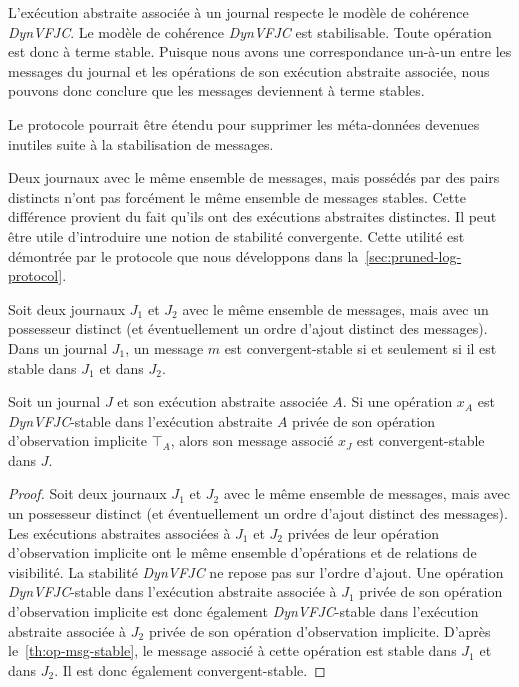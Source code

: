 L'exécution abstraite associée à un journal respecte le modèle de cohérence \emph{DynVFJC}.
Le modèle de cohérence \emph{DynVFJC} est stabilisable.
Toute opération est donc à terme stable.
Puisque nous avons une correspondance un-à-un entre les messages du journal et les opérations de son exécution abstraite associée, nous pouvons donc conclure que les messages deviennent à terme stables.

Le protocole pourrait être étendu pour supprimer les méta-données devenues inutiles suite à la stabilisation de messages.

Deux journaux avec le même ensemble de messages, mais possédés par des pairs distincts n'ont pas forcément le même ensemble de messages stables.
Cette différence provient du fait qu'ils ont des exécutions abstraites distinctes.
Il peut être utile d'introduire une notion de stabilité convergente.
Cette utilité est démontrée par le protocole que nous développons dans la~\autoref{sec:pruned-log-protocol}.

\begin{definition}\label{def:msg-conv-stable}
Soit deux journaux $J_1$ et $J_2$ avec le même ensemble de messages, mais avec un possesseur distinct (et éventuellement un ordre d'ajout distinct des messages).
Dans un journal $J_1$, un message $m$ est convergent-stable si et seulement si il est stable dans $J_1$ et dans $J_2$.
\end{definition}

\begin{theorem}
Soit un journal $J$ et son exécution abstraite associée $A$.
Si une opération $x_A$ est \emph{DynVFJC}-stable dans l'exécution abstraite $A$ privée de son opération d'observation implicite $\top_A$, alors son message associé $x_J$ est convergent-stable dans $J$.
\end{theorem}

\begin{proof}
Soit deux journaux $J_1$ et $J_2$ avec le même ensemble de messages, mais avec un possesseur distinct (et éventuellement un ordre d'ajout distinct des messages).
Les exécutions abstraites associées à $J_1$ et $J_2$ privées de leur opération d'observation implicite ont le même ensemble d'opérations et de relations de visibilité.
La stabilité \emph{DynVFJC} ne repose pas sur l'ordre d'ajout.
Une opération \emph{DynVFJC}-stable dans l'exécution abstraite associée à $J_1$ privée de son opération d'observation implicite est donc également \emph{DynVFJC}-stable dans l'exécution abstraite associée à $J_2$ privée de son opération d'observation implicite.
D'après le~\autoref{th:op-msg-stable}, le message associé à cette opération est stable dans $J_1$ et dans $J_2$.
Il est donc également convergent-stable.
\end{proof}


